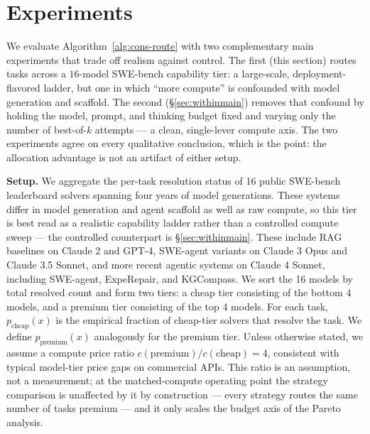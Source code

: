 \documentclass{article}
\begin{document}
\section{Experiments}
\label{sec:exp}

We evaluate Algorithm~\ref{alg:cons-route} with two complementary main
experiments that trade off realism against control. The first (this
section) routes tasks across a $16$-model SWE-bench
capability tier: a large-scale, deployment-flavored ladder, but one in
which ``more compute'' is confounded with model generation and
scaffold. The second (\S\ref{sec:withinmain}) removes that confound by
holding the model, prompt, and thinking budget fixed and varying only
the number of best-of-$k$ attempts --- a clean, single-lever
compute axis. The two experiments agree on every qualitative
conclusion, which is the point: the allocation advantage is not an
artifact of either setup.

\textbf{Setup.} We aggregate the per-task resolution status of 16
public SWE-bench leaderboard solvers spanning four years of model
generations. These systems differ in model generation and agent
scaffold as well as raw compute, so this tier is best read as a
realistic capability ladder rather than a controlled compute sweep ---
the controlled counterpart is \S\ref{sec:withinmain}. These include RAG baselines on Claude 2 and GPT-4,
SWE-agent variants on Claude 3 Opus and Claude 3.5 Sonnet, and more
recent agentic systems on Claude 4 Sonnet, including SWE-agent,
ExpeRepair, and KGCompass. We sort the 16 models by total resolved
count and form two tiers: a cheap tier consisting of the bottom
4 models, and a premium tier consisting of the top 4 models.
For each task, $p_{\mathrm{cheap}}(x)$ is the empirical fraction of
cheap-tier solvers that resolve the task. We define
$p_{\mathrm{premium}}(x)$ analogously for the premium tier. Unless
otherwise stated, we assume a compute price ratio
$c(\text{premium})/c(\text{cheap}) = 4$, consistent with typical
model-tier price gaps on commercial APIs. This ratio is an
assumption, not a measurement; at the matched-compute operating
point the strategy comparison is unaffected by it by construction
--- every strategy routes the same number of tasks premium --- and
it only scales the budget axis of the Pareto analysis.
\end{document}
